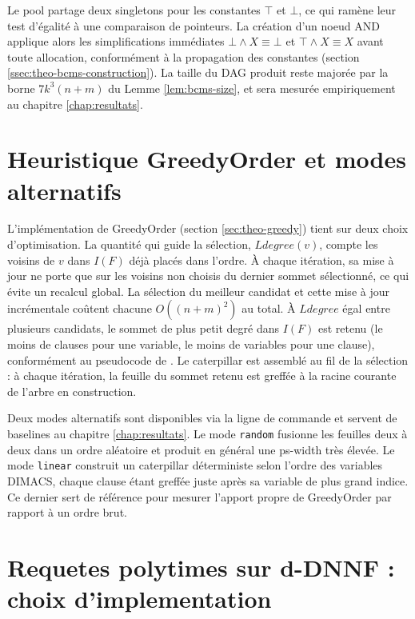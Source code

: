 \documentclass[11pt,a4paper]{report}
\theoremstyle{plain}
\theoremstyle{definition}
\begin{document}
Le pool partage deux singletons pour les constantes $\top$ et $\bot$,
ce qui ramène leur test d'égalité à une comparaison de pointeurs. La
création d'un noeud AND applique alors les simplifications immédiates
$\bot \wedge X \equiv \bot$ et $\top \wedge X \equiv X$ avant toute
allocation, conformément à la propagation des constantes
(section \ref{ssec:theo-bcms-construction}). La taille du DAG produit
reste majorée par la borne $7 k^3 (n+m)$ du Lemme \ref{lem:bcms-size},
et sera mesurée empiriquement au chapitre \ref{chap:resultats}.

\section{Heuristique GreedyOrder et modes alternatifs}
\label{sec:impl-greedy}

L'implémentation de GreedyOrder (section \ref{sec:theo-greedy}) tient
sur deux choix d'optimisation. La quantité qui guide la sélection,
$\mathit{Ldegree}(v)$, compte les voisins de $v$ dans $I(F)$ déjà
placés dans l'ordre. À chaque itération, sa mise à jour ne porte que
sur les voisins non choisis du dernier sommet sélectionné, ce qui
évite un recalcul global. La sélection du meilleur candidat et cette
mise à jour incrémentale coûtent chacune $O((n+m)^2)$ au total. À
$\mathit{Ldegree}$ égal entre plusieurs candidats, le sommet de plus
petit degré dans $I(F)$ est retenu (le moins de clauses pour une
variable, le moins de variables pour une clause), conformément au
pseudocode de \cite{saether2015}. Le caterpillar est assemblé au fil
de la sélection : à chaque itération, la feuille du sommet retenu est
greffée à la racine courante de l'arbre en construction.

Deux modes alternatifs sont disponibles via la ligne de commande et
servent de baselines au chapitre \ref{chap:resultats}. Le mode
\texttt{random} fusionne les feuilles deux à deux dans un ordre
aléatoire et produit en général une ps-width très élevée. Le mode
\texttt{linear} construit un caterpillar déterministe selon l'ordre
des variables DIMACS, chaque clause étant greffée juste après sa
variable de plus grand indice. Ce dernier sert de référence pour
mesurer l'apport propre de GreedyOrder par rapport à un ordre brut.

\section{Requetes polytimes sur d-DNNF : choix d'implementation}
\label{sec:impl-queries}
\end{document}

